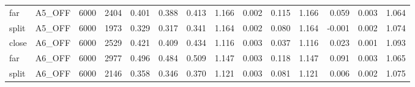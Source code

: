 \begin{tabular}{llrrrrrrrrrrrr}
far & A5_OFF & 6000 & 2404 & 0.401 & 0.388 & 0.413 & 1.166 & 0.002 & 0.115 & 1.166 & 0.059 & 0.003 & 1.064 \\
split & A5_OFF & 6000 & 1973 & 0.329 & 0.317 & 0.341 & 1.164 & 0.002 & 0.080 & 1.164 & -0.001 & 0.002 & 1.074 \\
close & A6_OFF & 6000 & 2529 & 0.421 & 0.409 & 0.434 & 1.116 & 0.003 & 0.037 & 1.116 & 0.023 & 0.001 & 1.093 \\
far & A6_OFF & 6000 & 2977 & 0.496 & 0.484 & 0.509 & 1.147 & 0.003 & 0.118 & 1.147 & 0.091 & 0.003 & 1.065 \\
split & A6_OFF & 6000 & 2146 & 0.358 & 0.346 & 0.370 & 1.121 & 0.003 & 0.081 & 1.121 & 0.006 & 0.002 & 1.075 \\
\bottomrule
\end{tabular}
